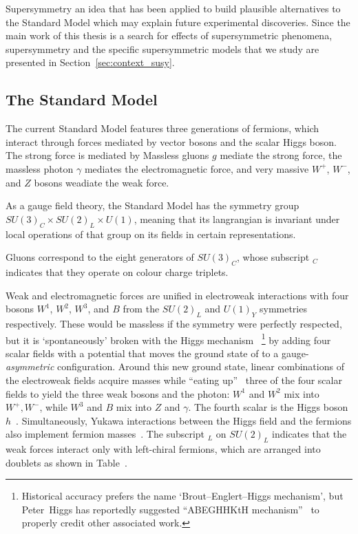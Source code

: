 Supersymmetry an idea that has been applied to build plausible alternatives
to the Standard Model which may explain future experimental discoveries.
Since the main work of this thesis is a search for effects of supersymmetric
phenomena, supersymmetry and the specific supersymmetric models that we study
are presented in Section~\ref{sec:context_susy}.


\subsection{The Standard Model}
\label{sec:context_sm}
The current Standard Model features three generations of fermions,
which interact through forces mediated by vector bosons
and the scalar Higgs boson.
The strong force is mediated by
Massless gluons $g$ mediate the strong force,
the massless photon $\gamma$ mediates the electromagnetic force,
and very massive $W^+$, $W^-$, and $Z$ bosons weadiate the weak force.

As a gauge field theory, the Standard Model has the symmetry group
$SU\!(3)_C \times SU\!(2)_L \times U\!(1)$,
meaning that its langrangian is invariant under local operations of that group
on its fields in certain representations.

Gluons correspond to the eight generators of $SU\!(3)_C$, whose subscript $_C$
indicates that they operate on colour charge triplets.

Weak and electromagnetic forces are unified in electroweak interactions with
four bosons $W^1$, $W^2$, $W^3$, and $B$ from the
$SU\!(2)_L$ and $U\!(1)_Y$ symmetries respectively.
These would be massless if the symmetry were perfectly respected, but it is
`spontaneously' broken with the Higgs mechanism~\cite{
higgs1964broken,
englert1964broken
}%
\footnote{%
Historical accuracy prefers the name `Brout–Englert–Higgs mechanism', but
Peter~Higgs has reportedly suggested
``ABEGHHKtH mechanism''~\cite{close2011infinity}
to properly credit other associated work.%
}
by adding four scalar fields with a potential that moves the ground state of
to a gauge-\emph{asymmetric} configuration.
Around this new ground state, linear combinations of the electroweak fields
acquire masses while ``eating up''~\cite{rubakov1999classical} three of the
four scalar fields to yield the three weak bosons and the photon:
$W^1$ and $W^2$ mix into $W^+, W^-$, while $W^3$ and $B$ mix into $Z$ and
$\gamma$.
The fourth scalar is the Higgs boson $h$~\cite{
glashow1959renorm,
weinberg1967model,
salam1959weak,
rubakov1999classical,
cottingham2007greenwood
}.
Simultaneously, Yukawa interactions between the Higgs field and the fermions
also implement fermion masses~\cite{thomson2013modern}.
The subscript $_L$ on $SU\!(2)_L$ indicates that the weak forces interact only
with left-chiral fermions, which are arranged into doublets as shown in
Table~.

